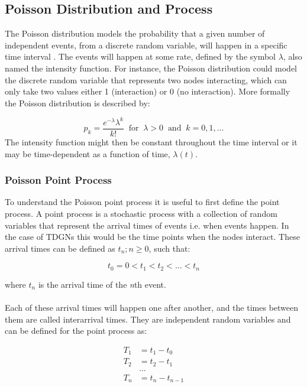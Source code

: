 
\subsection{Poisson Distribution and Process}
\label{sec:Method:Poisson}

The Poisson distribution models the probability that a given number of independent events, from a discrete random variable, will happen in a specific time interval \cite{PoissonScience}. 
The events will happen at some rate, defined by the symbol $\lambda$, also named the intensity function. 
For instance, the Poisson distribution could model the discrete random variable that represents two nodes interacting, which can only take two values either 1 (interaction) or 0 (no interaction).
More formally the Poisson distribution is described by:

\begin{equation}
    p_k = \frac{e^{-\lambda}\lambda^k}{k!} \;\; \text{for} \;\; \lambda > 0 \;\; \text{and} \;\; k = 0,1,\dots
\end{equation}
The intensity function might then be constant throughout the time interval or it may be time-dependent as a function of time, $\lambda(t)$.



\subsubsection{Poisson Point Process}
\label{sec:Method:Poisson:PoissonPointProcess}

To understand the Poisson point process it is useful to first define the point process. 
A point process is a stochastic process with a collection of random variables that represent the arrival times of events i.e. when events happen. 
In the case of TDGNs this would be the time points when the nodes interact. 
These arrival times can be defined as ${t_n ; n \ge 0}$, such that:

$$
t_0 = 0 < t_1 < t_2 < ... < t_n
$$

where $t_n$ is the arrival time of the \textit{n}th event.
\\\\
Each of these arrival times will happen one after another, and the times between them are called interarrival times. 
They are independent random variables and can be defined for the point process as:

\begin{align*}
T_1 &= t_1 - t_0 \\
T_2 &= t_2 - t_1 \\
&\dots \\
T_n &= t_n - t_{n-1}
\end{align*}

